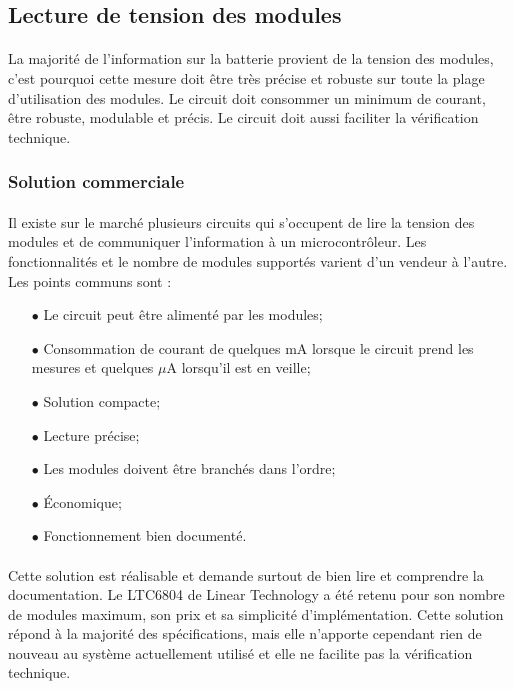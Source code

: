 \subsection{Lecture de tension des modules}
	\paragraph*{}
	La majorité de l'information sur la batterie provient de la tension des modules, c'est pourquoi cette mesure doit être très précise et robuste sur toute la plage d'utilisation des modules. Le circuit doit consommer un minimum de courant, être robuste, modulable et précis. Le circuit doit aussi faciliter la vérification technique.

	\subsubsection*{Solution commerciale}
	\paragraph*{}
	Il existe sur le marché plusieurs circuits qui s'occupent de lire la tension des modules et de communiquer l'information à un microcontrôleur. Les fonctionnalités et le nombre de modules supportés varient d'un vendeur à l'autre. Les points communs sont :

	\begin{multicols}{2}
		\begin{itemize}
			\item[$\bullet$] Le circuit peut être alimenté par les modules;
			\item[$\bullet$] Consommation de courant de quelques mA lorsque le circuit prend les mesures et quelques $\mu$A lorsqu'il est en veille;
			\item[$\bullet$] Solution compacte;
			\item[$\bullet$] Lecture précise;
			\item[$\bullet$] Les modules doivent être branchés dans l'ordre;
			\item[$\bullet$] Économique;
			\item[$\bullet$] Fonctionnement bien documenté.
		\end{itemize}
	\end{multicols}

	\paragraph*{}
	Cette solution est réalisable et demande surtout de bien lire et comprendre la documentation. Le LTC6804 de Linear Technology a été retenu pour son nombre de modules maximum, son prix et sa simplicité d'implémentation. Cette solution répond à la majorité des spécifications, mais elle n'apporte cependant rien de nouveau au système actuellement utilisé et elle ne facilite pas la vérification technique.



